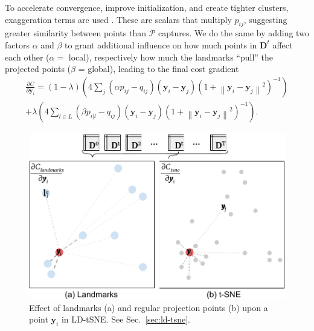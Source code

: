 To accelerate convergence, improve initialization, and create tighter clusters, exaggeration terms are used \citep{vanderMaaten2008,vanderMaaten2015,Linderman2017,Linderman2017a}. These are scalars that multiply $p_{i j}$, suggesting greater similarity between points than $\mathcal P$ captures. We do the same by adding two factors $\alpha$ and $\beta$ to grant additional influence on how much points in $\mathbf{D}^t$ affect each other ($\alpha = $ local), respectively how much the landmarks ``pull'' the projected points ($\beta$ = global), leading to the final cost gradient
%
\begin{equation*}
 \begin{aligned}
  \frac{\partial C}{\partial \mathbf{y}_{i}} =(1-\lambda)\left(4 \sum_{j}\left(\alpha p_{i j}-q_{i j}\right)\left(\mathbf{y}_{i}-\mathbf{y}_{j}\right)\left(1+\left\|\mathbf{y}_{i}-\mathbf{y}_{j}\right\|^{2}\right)^{-1}\right) \\
  +\lambda\left(4 \sum_{l \in L}\left(\beta p_{i | l}-q_{i j}\right)\left(\mathbf{y}_{i}-\mathbf{y}_{j}\right)\left(1+\left\|\mathbf{y}_{i}-\mathbf{y}_{j}\right\|^{2}\right)^{-1}\right).
 \end{aligned}
\end{equation*}
%

%
\begin{figure}[h]\centering
  \includegraphics[width=\linewidth]{figures/projection-algorithm/ldtsne.pdf}
  \caption{Effect of landmarks (a) and regular projection points (b) upon a point $\mathbf{y}_i$ in LD-tSNE. See Sec.~\ref{sec:ld-tsne}.}
  \label{fig:ldtsne}
\end{figure}

